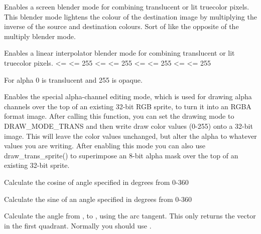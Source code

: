 
Enables a screen blender mode for combining translucent or lit truecolor pixels. This blender mode lightens the colour of the destination image by multiplying the inverse of the source and destination colours. Sort of like the opposite of the multiply blender mode.


Enables a linear interpolator blender mode for combining translucent or lit truecolor pixels.
 <=  <= 255 <=  <= 255 <=  <= 255 <=  <= 255\newline

For alpha 0 is translucent and 255 is opaque.


Enables the special alpha-channel editing mode, which is used for drawing alpha channels over the top of an existing 32-bit RGB sprite, to turn it into an RGBA format image. After calling this function, you can set the drawing mode to DRAW_MODE_TRANS and then write draw color values (0-255) onto a 32-bit image.  This will leave the color values unchanged, but alter the alpha to whatever values you are writing. After enabling this mode you can also use draw_trans_sprite() to superimpose an 8-bit alpha mask over the top of an existing 32-bit sprite.


Calculate the cosine of angle specified in degrees from 0-360


Calculate the sine of an angle specified in degrees from 0-360


Calculate the angle from , to , using the arc tangent. This only returns the vector in the first quadrant. Normally you should use .


